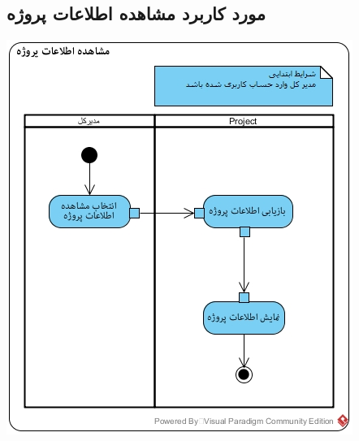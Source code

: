 \subsection*{مورد کاربرد مشاهده اطلاعات پروژه}
\vspace{2cm}
\begin{center}
\includegraphics[width=\textwidth]{ActivityDiagramsWithSwimlanes/31.jpg}
\end{center}
\newpage
\vspace{2cm}
